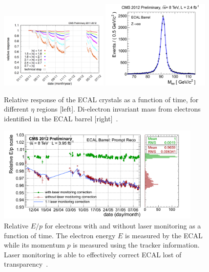 \begin{figure}[!Hhtbp]
  \begin{center}
    \includegraphics[width=0.48\textwidth]{figs/laser_monitoring_histories_2011-2012.png}
    \includegraphics[width=0.48\textwidth]{figs/_500___2012_zee_eb_golden.png}
    \caption{Relative response of the ECAL crystals as a function of time, for different $\eta$ regions [left]. Di-electron invariant mass from electrons identified in the ECAL barrel [right]~\cite{CMS-DP-2012-015}.}
    \label{fig:RelaResp}
  \end{center}
\end{figure}

\begin{figure}[!Hhtbp]
  \begin{center}
    \includegraphics[width=0.9\textwidth]{figs/EoverP_history_2012.png}
    \caption{Relative $E/p$ for electrons with and without laser monitoring as a function of time. The electron energy $E$ is measured by the ECAL while its momentum $p$ is measured using the tracker information. Laser monitoring is able to effectively correct ECAL lost of transparency~\cite{CMS-DP-2012-015}.}
    \label{figs:RelEp}
  \end{center}
\end{figure}

